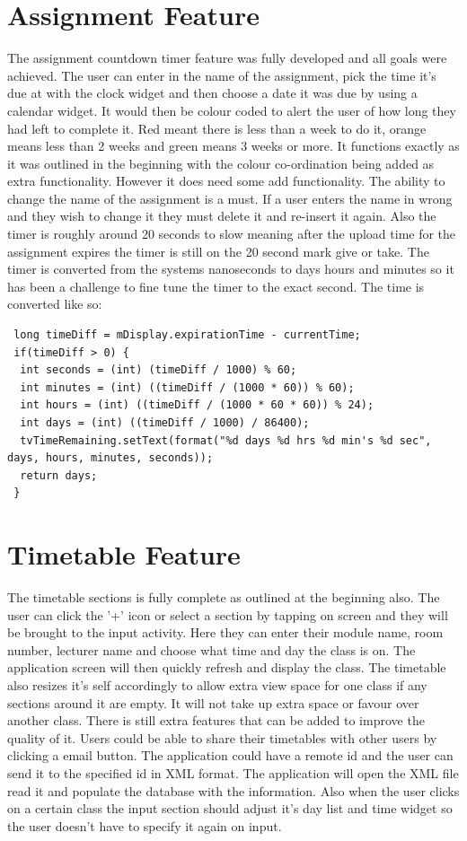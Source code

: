 \section{Assignment Feature}
The assignment countdown timer feature was fully developed and all goals were achieved. The user can enter in the name of the assignment, pick the time it's due at with the clock widget and then choose a date it was due by using a calendar widget. It would then be colour coded to alert the user of how long they had left to complete it. Red meant there is less than a week to do it, orange means less than 2 weeks and green means 3 weeks or more. It functions exactly as it was outlined in the beginning with the colour co-ordination being added as extra functionality. However it does need some add functionality. The ability to change the name of the assignment is a must. If a user enters the name in wrong and they wish to change it they must delete it and re-insert it again. Also the timer is roughly around 20 seconds to slow meaning after the upload time for the assignment expires the timer is still on the 20 second mark give or take. The timer is converted from the systems nanoseconds to days hours and minutes so it has been a challenge to fine tune the timer to the exact second. The time is converted like so:
\begin{verbatim}
 long timeDiff = mDisplay.expirationTime - currentTime;
 if(timeDiff > 0) {
  int seconds = (int) (timeDiff / 1000) % 60;
  int minutes = (int) ((timeDiff / (1000 * 60)) % 60);
  int hours = (int) ((timeDiff / (1000 * 60 * 60)) % 24);
  int days = (int) ((timeDiff / 1000) / 86400);
  tvTimeRemaining.setText(format("%d days %d hrs %d min's %d sec", days, hours, minutes, seconds));
  return days;
 }
\end{verbatim}

\section{Timetable Feature}
The timetable sections is fully complete as outlined at the beginning also. The user can click the '+' icon or select a section by tapping on screen and they will be brought to the input activity. Here they can enter their module name, room number, lecturer name and choose what time and day the class is on. The application screen will then quickly refresh and display the class. The timetable also resizes it's self accordingly to allow extra view space for one class if any sections around it are empty. It will not take up extra space or favour over another class. There is still extra features that can be added to improve the quality of it. Users could be able to share their timetables with other users by clicking a email button. The application could have a remote id and the user can send it to the specified id in XML format. The application will open the XML file read it and populate the database with the information. Also when the user clicks on a certain class the input section should adjust it's day list and time widget so the user doesn't have to specify it again on input.

